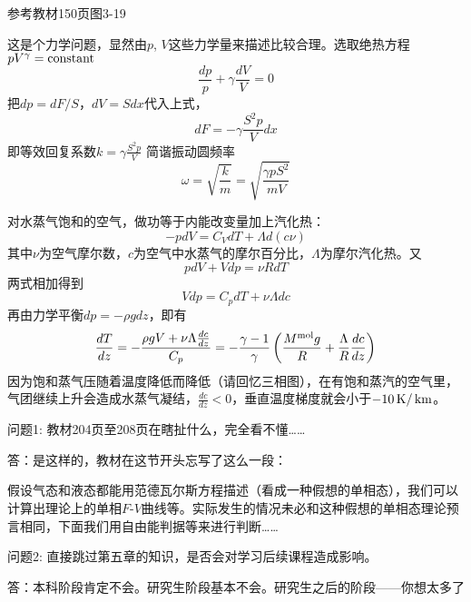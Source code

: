 \documentclass[CJK]{beamer}
\begin{document}
\begin{frame}
\end{frame}

\begin{frame}
\bch
参考教材150页图3-19

这是个力学问题，显然由$p$, $V$这些力学量来描述比较合理。选取绝热方程$pV^\gamma = \mathrm{constant}$
$$ \frac{dp}{p} + \gamma \frac{dV}{V} = 0$$
把$dp = dF/S$，$dV = S dx$代入上式，
$$ dF = -\gamma \frac{S^2p}{V} dx $$
即等效回复系数$k =\gamma \frac{S^2p}{V} $ 简谐振动圆频率
$$\omega = \sqrt{\frac{k}{m}} = \sqrt{\frac{\gamma p S^2}{mV}}$$
\ech
\end{frame}

\begin{frame}
\bch
{\small
对水蒸气饱和的空气，做功等于内能改变量加上汽化热：
$$ -pdV = C_V dT + \Lambda d(c\nu) $$
其中$\nu$为空气摩尔数，$c$为空气中水蒸气的摩尔百分比，$\Lambda$为摩尔汽化热。又
$$pdV + Vdp = \nu R dT$$
两式相加得到
$$ Vdp = C_p  dT + \nu \Lambda dc $$
再由力学平衡$ dp = -\rho g dz$，即有
$$ \frac{dT}{dz} =-\frac{\rho g V + \nu\Lambda\frac{dc}{dz}}{C_p} = -\frac{\gamma-1}{\gamma}\left(\frac{M^{\rm mol}g}{R}+\frac{\Lambda}{R}\frac{dc}{dz}\right)$$
因为饱和蒸气压随着温度降低而降低（请回忆三相图），在有饱和蒸汽的空气里，气团继续上升会造成水蒸气凝结，$ \frac{dc}{dz} < 0 $，垂直温度梯度就会小于$-10\,\mathrm{K}/\,\mathrm{km}$。
}
\ech
\end{frame}


\begin{frame}
  \bch
  问题1: 教材204页至208页在瞎扯什么，完全看不懂……

  \skiplines
  
  答：是这样的，教材在这节开头忘写了这么一段：

  {\small 假设气态和液态都能用范德瓦尔斯方程描述（看成一种假想的单相态），我们可以计算出理论上的单相$F$-$V$曲线等。实际发生的情况未必和这种假想的单相态理论预言相同，下面我们用自由能判据等来进行判断……}

  \ech
\end{frame}


\begin{frame}
  \bch
  问题2: 直接跳过第五章的知识，是否会对学习后续课程造成影响。

  \skiplines
  
  答：本科阶段肯定不会。研究生阶段基本不会。研究生之后的阶段——你想太多了\bye

  \ech
\end{frame}
\end{document}
